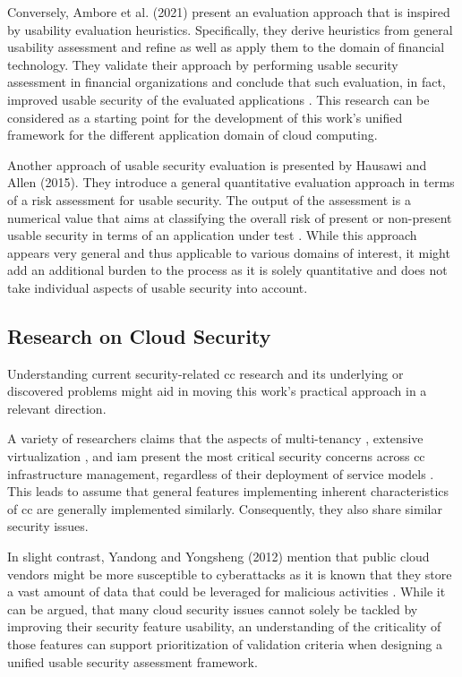 Conversely, Ambore et al. (2021) present an evaluation approach that is inspired by usability evaluation heuristics. Specifically, they derive heuristics from general usability assessment and refine as well as apply them to the domain of financial technology. They validate their approach by performing usable security assessment in financial organizations and conclude that such evaluation, in fact, improved usable security of the evaluated applications \cite{ambore_development_2021}. This research can be considered as a starting point for the development of this work's unified framework for the different application domain of cloud computing.

Another approach of usable security evaluation is presented by Hausawi and Allen (2015). They introduce a general quantitative evaluation approach in terms of a risk assessment for usable security. The output of the assessment is a numerical value that aims at classifying the overall risk of present or non-present usable security in terms of an application under test \cite{tryfonas_usable-security_2015}. While this approach appears very general and thus applicable to various domains of interest, it might add an additional burden to the process as it is solely quantitative and does not take individual aspects of usable security into account.

\subsection{Research on Cloud Security}
Understanding current security-related \ac{cc} research and its underlying or discovered problems might aid in moving this work's practical approach in a relevant direction.

A variety of researchers claims that the aspects of multi-tenancy \cite{hashizume_analysis_2013, singh_cloud_2017,paxton_cloud_2016,manakattu_security_2020}, extensive virtualization \cite{felsch_how_2015,hashizume_analysis_2013}, and \ac{iam} \cite{almulla_cloud_2010} present the most critical security concerns across \ac{cc} infrastructure management, regardless of their deployment of service models \cite{manakattu_security_2020}. This leads to assume that general features implementing inherent characteristics of \ac{cc} are generally implemented similarly. Consequently, they also share similar security issues.

In slight contrast, Yandong and Yongsheng (2012) mention that public cloud vendors might be more susceptible to cyberattacks as it is known that they store a vast amount of data that could be leveraged for malicious activities \cite{yandong_cloud_2012}. While it can be argued, that many cloud security issues cannot solely be tackled by improving their security feature usability, an understanding of the criticality of those features can support prioritization of validation criteria when designing a unified usable security assessment framework. 

